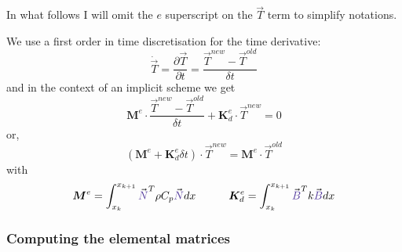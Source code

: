 In what follows I will omit the $e$ superscript on the $\vec{T}$ term to simplify notations. 

We use a first order in time discretisation for the time derivative:
\[
\dot{\vec T}= \frac{\partial {\vec T}}{\partial t} = \frac{{\vec T}^{new}-{\vec T}^{old}}{\delta t}
\]
and in the context of an implicit scheme we get
\[
{\bm M}^e \cdot \frac{{\vec T}^{new}-{\vec T}^{old}}{\delta t} + {\bm K}_d^e \cdot {\vec T}^{new} = 0
\]
or, 
\[
\boxed{
( {\bm M}^e +  {\bm K}_d^e  \delta t ) \cdot {\vec T}^{new} =  {\bm M}^e \cdot  {\vec T}^{old}
}
\]
with 
\[
{\bm M}^e=  \int_{x_k}^{x_{k+1}}   {\vec {\color{Violet}N}}^T \rho C_p {\vec {\color{Violet}N}} dx  
\quad\quad\quad
{\bm K}_d^e =
 \int_{x_k}^{x_{k+1}}   {\vec {\color{Violet}B}}^T k {\vec {\color{Violet}B}} dx 
\]

\subsubsection{Computing the elemental matrices}

